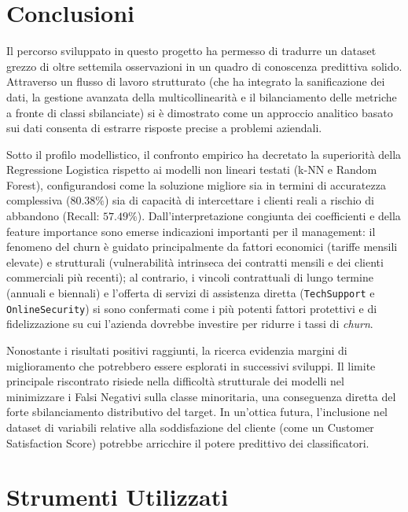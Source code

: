 \documentclass[11pt,a4paper]{article}
\begin{document}
\section{Conclusioni}
Il percorso sviluppato in questo progetto ha permesso di tradurre un dataset grezzo di oltre settemila osservazioni in un quadro di conoscenza predittiva solido. Attraverso un flusso di lavoro strutturato (che ha integrato la sanificazione dei dati, la gestione avanzata della multicollinearità e il bilanciamento delle metriche a fronte di classi sbilanciate) si è dimostrato come un approccio analitico basato sui dati consenta di estrarre risposte precise a problemi aziendali.

Sotto il profilo modellistico, il confronto empirico ha decretato la superiorità della Regressione Logistica rispetto ai modelli non lineari testati (k-NN e Random Forest), configurandosi come la soluzione migliore sia in termini di accuratezza complessiva ($80.38\%$) sia di capacità di intercettare i clienti reali a rischio di abbandono (Recall: $57.49\%$). Dall'interpretazione congiunta dei coefficienti e della feature importance sono emerse indicazioni importanti per il management: il fenomeno del churn è guidato principalmente da fattori economici (tariffe mensili elevate) e strutturali (vulnerabilità intrinseca dei contratti mensili e dei clienti commerciali più recenti); al contrario, i vincoli contrattuali di lungo termine (annuali e biennali) e l'offerta di servizi di assistenza diretta (\texttt{TechSupport} e \texttt{OnlineSecurity}) si sono confermati come i più potenti fattori protettivi e di fidelizzazione su cui l'azienda dovrebbe investire per ridurre i tassi di \textit{churn}.

Nonostante i risultati positivi raggiunti, la ricerca evidenzia margini di miglioramento che potrebbero essere esplorati in successivi sviluppi. Il limite principale riscontrato risiede nella difficoltà strutturale dei modelli nel minimizzare i Falsi Negativi sulla classe minoritaria, una conseguenza diretta del forte sbilanciamento distributivo del target. In un'ottica futura, l'inclusione nel dataset di variabili relative alla soddisfazione del cliente (come un Customer Satisfaction Score) potrebbe arricchire il potere predittivo dei classificatori.


\section{Strumenti Utilizzati}
\end{document}
